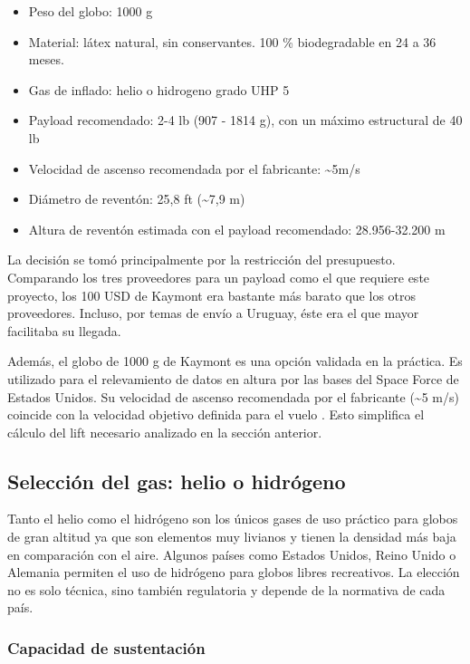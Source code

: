 \documentclass[12pt,a4paper]{article}
\begin{document}
\begin{itemize}
\item
  Peso del globo: 1000 g
\item
  Material: látex natural, sin conservantes. 100 \% biodegradable en 24 a 36 meses.
\item
  Gas de inflado: helio o hidrogeno grado UHP 5
\item
  Payload recomendado: 2-4 lb (907 - 1814 g), con un máximo estructural de 40 lb
\item
  Velocidad de ascenso recomendada por el fabricante: \textasciitilde5m/s
\item
  Diámetro de reventón: 25,8 ft (\textasciitilde7,9 m)
\item
  Altura de reventón estimada con el payload recomendado: 28.956-32.200 m
\end{itemize}

La decisión se tomó principalmente por la restricción del presupuesto. Comparando los tres proveedores para un payload como el que requiere este proyecto, los 100 USD de Kaymont era bastante más barato que los otros proveedores. Incluso, por temas de envío a Uruguay, éste era el que mayor facilitaba su llegada.

Además, el globo de 1000 g de Kaymont es una opción validada en la práctica. Es utilizado para el relevamiento de datos en altura por las bases del Space Force de Estados Unidos. Su velocidad de ascenso recomendada por el fabricante (\textasciitilde5 m/s) coincide con la velocidad objetivo definida para el vuelo \cite{ref77}. Esto simplifica el cálculo del lift necesario analizado en la sección anterior.

\subsection{Selección del gas: helio o hidrógeno}\label{evaluaciuxf3n-de-helio-e-hidruxf3geno}

Tanto el helio como el hidrógeno son los únicos gases de uso práctico para globos de gran altitud ya que son elementos muy livianos y tienen la densidad más baja en comparación con el aire. Algunos países como Estados Unidos, Reino Unido o Alemania permiten el uso de hidrógeno para globos libres recreativos. La elección no es solo técnica, sino también regulatoria y depende de la normativa de cada país.

\subsubsection{Capacidad de sustentación}\label{capacidad-de-sustentaciuxf3n}
\end{document}
